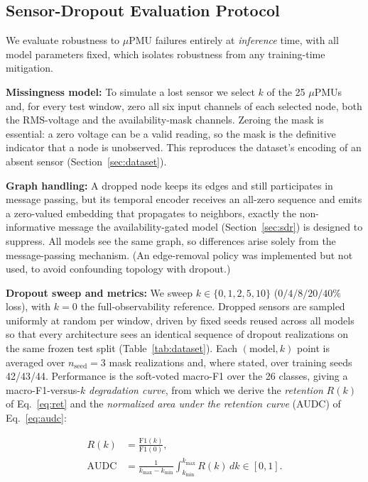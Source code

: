 \documentclass[3p,times,procedia]{elsarticle}
\begin{document}
\subsection{Sensor-Dropout Evaluation Protocol}
\label{sec:dropout-eval}

We evaluate robustness to $\mu$PMU failures entirely at \emph{inference} time, with all model parameters fixed, which isolates robustness from any training-time mitigation.

\textbf{Missingness model:} To simulate a lost sensor we select $k$ of the 25 $\mu$PMUs and, for every test window, zero all six input channels of each selected node, both the RMS-voltage and the availability-mask channels. Zeroing the mask is essential: a zero voltage can be a valid reading, so the mask is the definitive indicator that a node is unobserved. This reproduces the dataset's encoding of an absent sensor (Section~\ref{sec:dataset}).

\textbf{Graph handling:} A dropped node keeps its edges and still participates in message passing, but its temporal encoder receives an all-zero sequence and emits a zero-valued embedding that propagates to neighbors, exactly the non-informative message the availability-gated model (Section~\ref{sec:sdr}) is designed to suppress. All models see the same graph, so differences arise solely from the message-passing mechanism. (An edge-removal policy was implemented but not used, to avoid confounding topology with dropout.)

\textbf{Dropout sweep and metrics:} We sweep $k \in \{0,1,2,5,10\}$ ($0/4/8/20/40\%$ loss), with $k=0$ the full-observability reference. Dropped sensors are sampled uniformly at random per window, driven by fixed seeds reused across all models so that every architecture sees an identical sequence of dropout realizations on the same frozen test split (Table~\ref{tab:dataset}). Each $(\mathrm{model},k)$ point is averaged over $n_{\mathrm{seed}}=3$ mask realizations and, where stated, over training seeds 42/43/44. Performance is the soft-voted macro-F1 over the 26 classes, giving a macro-F1-versus-$k$ \emph{degradation curve}, from which we derive the \emph{retention} $R(k)$ of Eq.~\eqref{eq:ret} and the \emph{normalized area under the retention curve} (AUDC) of Eq.~\eqref{eq:audc}:

\begin{align}
\label{eq:ret}
R(k) &= \frac{\mathrm{F1}(k)}{\mathrm{F1}(0)}, \\
\label{eq:audc}
\mathrm{AUDC} &= \frac{1}{k_{\max}-k_{\min}}\int_{k_{\min}}^{k_{\max}} R(k)\,dk \in[0,1].
\end{align}
\end{document}

